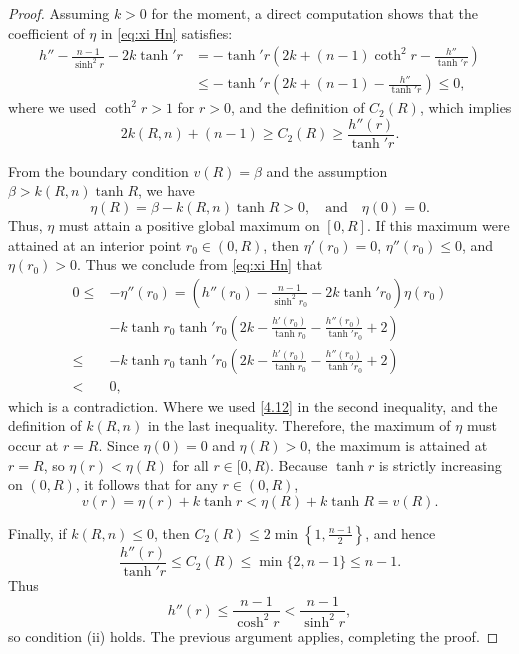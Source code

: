 \documentclass[11pt,leqno]{amsart}
\numberwithin{equation}{section}
\begin{document}
\begin{proof}
Assuming $k > 0$ for the moment, a direct computation shows that the coefficient of $\eta$ in \eqref{eq:xi Hn} satisfies:
\begin{align}\label{4.12}
    h''-\frac{n-1}{\sinh^{2}r}-2k\tanh' r &= -\tanh' r\left(2k+(n-1)\coth^{2}r-\frac{h''}{\tanh' r}\right) \\
    &\le -\tanh' r\left(2k+(n-1)-\frac{h''}{\tanh' r}\right) \le 0,\nonumber
\end{align}
where we used  $\coth^2 r > 1$ for $r > 0$, and the definition of $C_2(R)$, which implies $$2k(R, n) + (n-1) \ge C_2(R) \ge \frac{h''(r)}{\tanh' r}.$$

From the boundary condition $v(R) = \beta$ and the assumption $\beta > k(R, n) \tanh R$, we  have
$$\eta(R) = \beta - k(R, n)\tanh R > 0, \quad \text{and}\quad \eta(0) = 0.$$ 
Thus, $\eta$ must attain a positive global maximum on $[0, R]$. If this maximum were attained at an interior point $r_{0}\in (0,R)$, then $\eta'(r_{0})=0$, $\eta''(r_{0})\leq 0$, and $\eta(r_0) > 0$. Thus we conclude from \eqref{eq:xi Hn} that
\begin{align*}
0\le& - \eta''(r_0)= \left(h''(r_0)-\frac{n-1}{\sinh^{2}r_0}-2k\tanh' r_0\right)\eta(r_0)\\ 
    &-k\tanh r_0\tanh' r_0\left(2k-\frac{h'(r_0)}{\tanh r_0}-\frac{h''(r_0)}{\tanh' r_0}+2\right)\\
     \le & -k\tanh r_0\tanh' r_0\left(2k-\frac{h'(r_0)}{\tanh r_0}-\frac{h''(r_0)}{\tanh' r_0}+2\right)\\
     < & 0,
\end{align*}
which is a contradiction. Where  we used  \eqref{4.12} in the second inequality, and the definition of $k(R, n)$ in the last inequality. 
Therefore, the maximum of $\eta$ must occur at $r=R$. Since $\eta(0)=0$ and $\eta(R)>0$, the maximum is attained at $r=R$, so $\eta(r) < \eta(R)$ for all $r \in [0, R)$. Because $\tanh r$ is strictly increasing on $(0, R)$, it follows that for any $r \in (0, R)$,
\begin{equation*}
    v(r) = \eta(r) + k\tanh r < \eta(R) + k\tanh R = v(R).
\end{equation*}

Finally, if $k(R,n)\le 0$, then $C_2(R)\le 2 \min \left\{1,\frac{n-1}{2}\right\}$, and hence
$$
\frac{h''(r)}{\tanh' r}\leq C_2(R) \le \min\{2, n-1\} \le n-1.
$$
Thus
\begin{equation*}
    h''(r) \leq \frac{n-1}{\cosh^{2}r} < \frac{n-1}{\sinh^{2}r},
\end{equation*}
so condition  (ii) holds. The previous argument applies, completing the proof. 
\end{proof}
\end{document}

